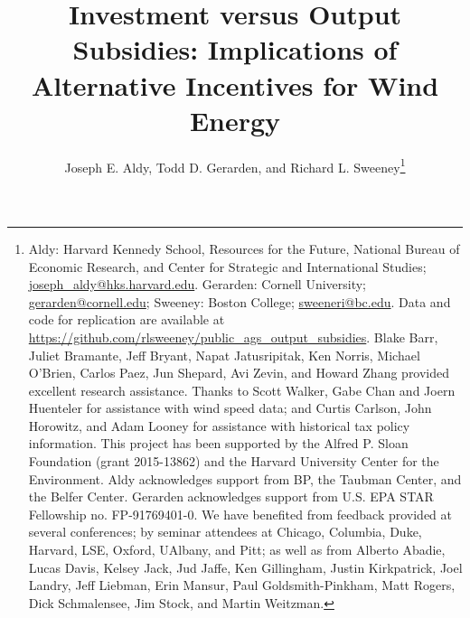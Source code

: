 \documentclass[12pt]{article}
\begin{document}
\title{Investment versus Output Subsidies: Implications of Alternative Incentives for Wind Energy}

\author{Joseph E. Aldy, Todd D. Gerarden, and Richard L. Sweeney\thanks{\protect Aldy: Harvard Kennedy School, Resources for the Future, National Bureau of Economic Research, and Center for Strategic and International Studies; \protect\href{mailto:joseph_aldy@hks.harvard.edu}{joseph\_{}aldy@hks.harvard.edu}. Gerarden: Cornell University; \protect\href{mailto: gerarden@cornell.edu}{ gerarden@cornell.edu};
Sweeney: Boston College; \protect\href{mailto:sweeneri@bc.edu}{sweeneri@bc.edu}. \newline \protect\hphantom{} \hspace{3ex} Data and code for replication are available at \protect\href{https://github.com/rlsweeney/public_ags_output_subsidies}{https://github.com/rlsweeney/public\_ags\_output\_subsidies}. \newline \protect\hphantom{} \hspace{3ex} Blake Barr, Juliet Bramante, Jeff Bryant, Napat Jatusripitak, Ken Norris, Michael O'Brien, Carlos Paez, Jun Shepard, Avi Zevin, and Howard Zhang provided excellent research assistance. Thanks to Scott Walker, Gabe Chan and Joern Huenteler for assistance with wind speed data; and Curtis Carlson, John Horowitz, and Adam Looney for assistance with historical tax policy information. This project has been supported by the Alfred P. Sloan Foundation (grant 2015-13862) and the Harvard University Center for the Environment. Aldy acknowledges support from BP, the Taubman Center, and the Belfer Center. Gerarden acknowledges support from U.S. EPA STAR Fellowship no. FP-91769401-0. We have benefited from feedback provided at several conferences; by seminar attendees at Chicago, Columbia, Duke, Harvard, LSE, Oxford, UAlbany, and Pitt; as well as from Alberto Abadie, Lucas Davis, Kelsey Jack, Jud Jaffe, Ken Gillingham, Justin Kirkpatrick, Joel Landry, Jeff Liebman, Erin Mansur, Paul Goldsmith-Pinkham, Matt Rogers, Dick Schmalensee, Jim Stock, and Martin Weitzman. }}
\end{document}
